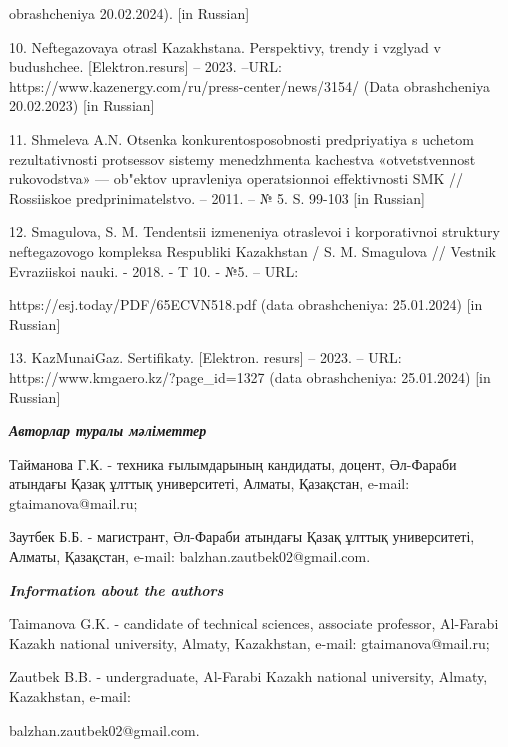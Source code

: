 \begin{noparindent}
obrashcheniya 20.02.2024). {[}in Russian{]}

10. Neftegazovaya otrasl\textquotesingle{} Kazakhstana. Perspektivy,
trendy i vzglyad v budushchee. {[}Elektron.resurs{]} -- 2023. --URL:
https://www.kazenergy.com/ru/press-center/news/3154/ (Data obrashcheniya
20.02.2023) {[}in Russian{]}

11. Shmeleva A.N. Otsenka konkurentosposobnosti predpriyatiya s uchetom
rezul\textquotesingle tativnosti protsessov sistemy menedzhmenta
kachestva «otvetstvennost\textquotesingle{} rukovodstva» --- ob"ektov
upravleniya operatsionnoi effektivnosti SMK // Rossiiskoe
predprinimatel\textquotesingle stvo. -- 2011. -- № 5. S. 99-103 {[}in
Russian{]}

12. Smagulova, S. M. Tendentsii izmeneniya otraslevoi i korporativnoi
struktury neftegazovogo kompleksa Respubliki Kazakhstan / S. M.
Smagulova // Vestnik Evraziiskoi nauki. - 2018. - T 10. - №5. -- URL:

https://esj.today/PDF/65ECVN518.pdf (data obrashcheniya: 25.01.2024)
{[}in Russian{]}

13. KazMunaiGaz. Sertifikaty. {[}Elektron. resurs{]} -- 2023. -- URL:
https://www.kmgaero.kz/?page\_id=1327 (data obrashcheniya: 25.01.2024)
{[}in Russian{]}
\end{noparindent}

\emph{{\bfseries Авторлар туралы мәліметтер}}

\begin{noparindent}
Тайманова Г.К. - техника ғылымдарының кандидаты, доцент, Әл-Фараби
атындағы Қазақ ұлттық университеті, Алматы, Қазақстан, e-mail:
gtaimanova@mail.ru;

Заутбек Б.Б. - магистрант, Әл-Фараби атындағы Қазақ ұлттық университеті,
Алматы, Қазақстан, e-mail: balzhan.zautbek02@gmail.com.
\end{noparindent}

\emph{{\bfseries Information about the authors}}

\begin{noparindent}
Taimanova G.K. - candidate of technical sciences, associate professor,
Al-Farabi Kazakh national university, Almaty, Kazakhstan, e-mail:
gtaimanova@mail.ru;

Zautbek B.B. - undergraduate, Al-Farabi Kazakh national university,
Almaty, Kazakhstan, e-mail:

balzhan.zautbek02@gmail.com.
\end{noparindent}
